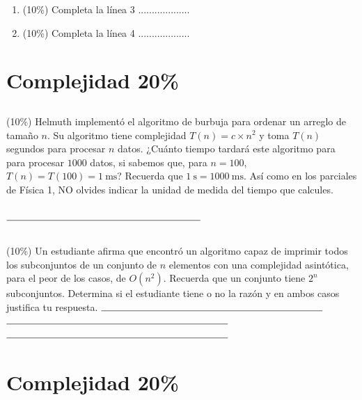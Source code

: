 \documentclass[10 pt]{article}
\begin{document}
\begin{multicols}{2}
\begin{enumerate}[label=\alph*]

	\item (10\%) Completa la línea 3 ...................
	\item (10\%) Completa la línea 4 ...................
\end{enumerate}
\section{Complejidad 20\%}
\subsection{} (10\%) Helmuth implementó el algoritmo de burbuja para ordenar un arreglo de tamaño $n$. Su algoritmo tiene complejidad $T(n) = c \times n^2$ y toma $T(n)$ segundos para procesar $n$ datos. ¿Cuánto tiempo tardará este algoritmo para para procesar $1000$ datos, si sabemos que, para $n = 100$, $T(n) = T(100) = \SI{1}{\milli\second}$? Recuerda que $\SI{1}{\second} = \SI{1000}{\milli\second}$. Así como en los parciales de Física 1, NO olvides indicar la unidad de medida del tiempo que calcules.\\ \\
$\rule{7cm}{0.15mm}$
\subsection{} (10\%) Un estudiante afirma que encontró un algoritmo capaz de imprimir todos los subconjuntos de un conjunto de $n$ elementos con una complejidad asintótica, para el peor de los casos, de $O(n^2)$. Recuerda que un conjunto tiene $2^n$ subconjuntos. Determina si el estudiante tiene o no la razón y en ambos casos justifica tu respuesta.
$\rule{8cm}{0.15mm}$
$\rule{8cm}{0.15mm}$
$\rule{8cm}{0.15mm}$

\section{Complejidad 20\%}

\end{multicols}
\end{document}
